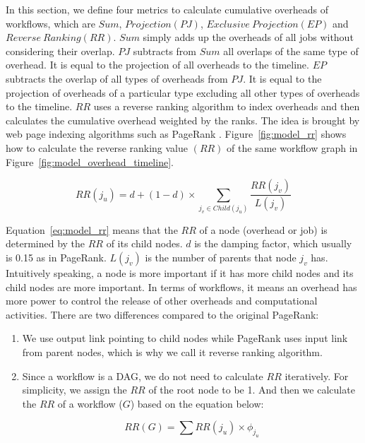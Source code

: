 
In this section, we define four metrics to calculate cumulative overheads of workflows, which are $Sum$, $Projection(PJ)$, $Exclusive~Projection(EP)$ and $Reverse~Ranking(RR)$. $Sum$ simply adds up the overheads of all jobs without considering their overlap. $PJ$ subtracts from $Sum$ all overlaps of the same type of overhead. It is equal to the projection of all overheads to the timeline. $EP$ subtracts the overlap of all types of overheads from $PJ$. It is equal to the projection of overheads of a particular type excluding all other types of overheads to the timeline.
$RR$ uses a reverse ranking algorithm to index overheads and then calculates the cumulative overhead weighted by the ranks. The idea is brought by web page indexing algorithms such as PageRank \cite{PageRank1999}. Figure~\ref{fig:model_rr} shows how to calculate the reverse ranking value $(RR)$ of the same workflow graph in Figure~\ref{fig:model_overhead_timeline}.
 
\begin{equation} \label{eq:model_rr}
RR(j_u)=d+(1-d)\times\sum_{j_v\in Child(j_u)}{}\frac{RR(j_v)}{L(j_v)}
\end{equation}

Equation~\ref{eq:model_rr} means that the $RR$ of a node (overhead or job) is determined by the $RR$ of its child nodes. $d$ is the damping factor, which usually is 0.15 as in PageRank. $L(j_v)$ is the number of parents that node $j_v$ has. Intuitively speaking, a node is more important if it has more child nodes and its child nodes are more important. In terms of workflows, it means an overhead has more power to control the release of other overheads and computational activities. There are two differences compared to the original PageRank: 
\begin{enumerate}
\item We use output link pointing to child nodes while PageRank uses input link from parent nodes, which is why we call it reverse ranking algorithm.
\item Since a workflow is a DAG, we do not need to calculate $RR$ iteratively. For simplicity, we assign the $RR$ of the root node to be 1. And then we calculate the $RR$ of a workflow ($G$) based on the equation below:

\begin{equation} \label{eq:model_sum_rr}
RR(G)=\sum_{}{}RR(j_u) \times \phi_{j_u}
\end{equation}

\end{enumerate}
 
